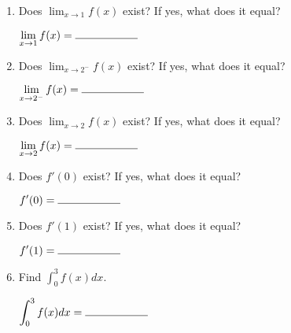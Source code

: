 \documentclass[11pt]{article}
\begin{document}
\begin{enumerate}
\begin{enumerate}[itemsep=10pt, label={\alph*)}]
\item Does $\displaystyle \lim_{x \to 1} f(x)$ exist? If yes, what does it equal?
    \begin{flushright}
$\displaystyle \lim_{x \to 1} f(x) = \rule{2cm}{0.4pt}$ \\
\end{flushright}
\item Does $\displaystyle \lim_{x \to 2^-} f(x)$ exist? If yes, what does it equal?
    \begin{flushright}
$\displaystyle \lim_{x \to 2^-} f(x) = \rule{2cm}{0.4pt}$ \\
\end{flushright}
\item Does $\displaystyle \lim_{x \to 2} f(x)$ exist? If yes, what does it equal?
    \begin{flushright}
$\displaystyle \lim_{x \to 2} f(x) = \rule{2cm}{0.4pt}$ \\
\end{flushright}
    \item Does $f'(0)$ exist? If yes, what does it equal?
    \begin{flushright}
$\displaystyle f'(0) = \rule{2cm}{0.4pt}$ \\
\end{flushright}
    \item Does $f'(1)$ exist? If yes, what does it equal?
    \begin{flushright}
$\displaystyle f'(1) = \rule{2cm}{0.4pt}$ \\
\end{flushright}
    \item Find $\displaystyle \int_{0}^{3} f(x)dx$.
    \begin{flushright}
$\displaystyle \int_{0}^{3} f(x)dx = \rule{2cm}{0.4pt}$ \\
\end{flushright}

\end{enumerate}

\newpage



\vspace{20pt}

\end{enumerate}
\end{document}
